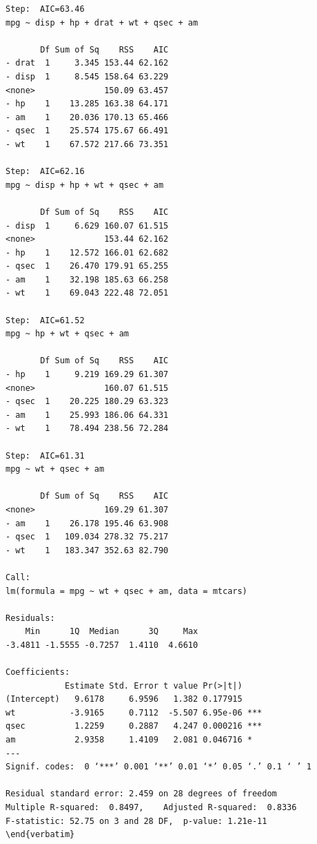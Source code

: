\documentclass{article}\usepackage[]{graphicx}\usepackage[]{xcolor}
\begin{document}
\begin{lstlisting}
Step:  AIC=63.46
mpg ~ disp + hp + drat + wt + qsec + am

       Df Sum of Sq    RSS    AIC
- drat  1     3.345 153.44 62.162
- disp  1     8.545 158.64 63.229
<none>              150.09 63.457
- hp    1    13.285 163.38 64.171
- am    1    20.036 170.13 65.466
- qsec  1    25.574 175.67 66.491
- wt    1    67.572 217.66 73.351

Step:  AIC=62.16
mpg ~ disp + hp + wt + qsec + am

       Df Sum of Sq    RSS    AIC
- disp  1     6.629 160.07 61.515
<none>              153.44 62.162
- hp    1    12.572 166.01 62.682
- qsec  1    26.470 179.91 65.255
- am    1    32.198 185.63 66.258
- wt    1    69.043 222.48 72.051

Step:  AIC=61.52
mpg ~ hp + wt + qsec + am

       Df Sum of Sq    RSS    AIC
- hp    1     9.219 169.29 61.307
<none>              160.07 61.515
- qsec  1    20.225 180.29 63.323
- am    1    25.993 186.06 64.331
- wt    1    78.494 238.56 72.284

Step:  AIC=61.31
mpg ~ wt + qsec + am

       Df Sum of Sq    RSS    AIC
<none>              169.29 61.307
- am    1    26.178 195.46 63.908
- qsec  1   109.034 278.32 75.217
- wt    1   183.347 352.63 82.790

Call:
lm(formula = mpg ~ wt + qsec + am, data = mtcars)

Residuals:
    Min      1Q  Median      3Q     Max 
-3.4811 -1.5555 -0.7257  1.4110  4.6610 

Coefficients:
            Estimate Std. Error t value Pr(>|t|)    
(Intercept)   9.6178     6.9596   1.382 0.177915    
wt           -3.9165     0.7112  -5.507 6.95e-06 ***
qsec          1.2259     0.2887   4.247 0.000216 ***
am            2.9358     1.4109   2.081 0.046716 *  
---
Signif. codes:  0 ‘***’ 0.001 ‘**’ 0.01 ‘*’ 0.05 ‘.’ 0.1 ‘ ’ 1

Residual standard error: 2.459 on 28 degrees of freedom
Multiple R-squared:  0.8497,	Adjusted R-squared:  0.8336 
F-statistic: 52.75 on 3 and 28 DF,  p-value: 1.21e-11
\end{verbatim}
\end{lstlisting}
\end{document}
